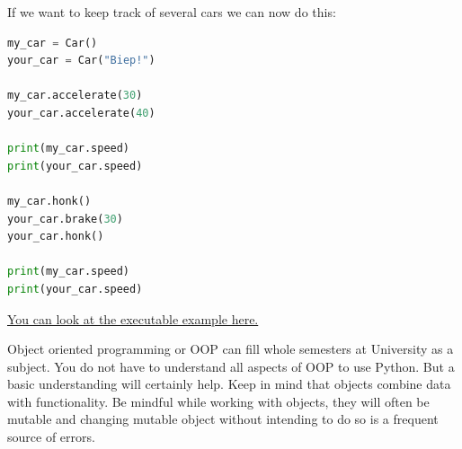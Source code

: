 \documentclass{article}
\begin{document}
If we want to keep track of several cars we can now do this:

\begin{lstlisting}[language=python]
my_car = Car()
your_car = Car("Biep!")

my_car.accelerate(30)
your_car.accelerate(40)

print(my_car.speed)
print(your_car.speed)

my_car.honk()
your_car.brake(30)
your_car.honk()

print(my_car.speed)
print(your_car.speed)
\end{lstlisting}

\href{http://pythontutor.com/visualize.html#code=class%20Car%28%29%3A%0A%0A%20%20%20%20horn_sound%3A%20str%20%3D%20%22Honk!%22%0A%20%20%20%20_speed%3A%20float%20%3D%200.0%0A%0A%20%20%20%20def%20__init__%28self,%20horn_sound%3A%20str%20%3D%20None%29%3A%0A%20%20%20%20%20%20%20%20if%20horn_sound%3A%0A%20%20%20%20%20%20%20%20%20%20%20%20self.horn_sound%20%3D%20horn_sound%0A%0A%20%20%20%20def%20accelerate%28self,%20kmh%3A%20float%20%3D%200.0%29%3A%0A%20%20%20%20%20%20%20%20self._speed%20%3D%20self._speed%20%2B%20kmh%0A%0A%20%20%20%20def%20brake%28self,%20target_kmh%3A%20float%20%3D%200.0%29%3A%0A%20%20%20%20%20%20%20%20if%20target_kmh%20%3C%20self._speed%3A%0A%20%20%20%20%20%20%20%20%20%20%20%20self._speed%20%3D%20float%28target_kmh%29%0A%0A%20%20%20%20def%20honk%28self%29%3A%0A%20%20%20%20%20%20%20%20print%28self.horn_sound%29%0A%0A%20%20%20%20%40property%0A%20%20%20%20def%20speed%28self%29%3A%0A%20%20%20%20%20%20%20%20return%20f%22%7Bself._speed%7D%20km/h%22%0A%20%20%20%20%20%20%20%20%0Amy_car%20%3D%20Car%28%29%0Ayour_car%20%3D%20Car%28%22Biep!%22%29%0A%0Amy_car.accelerate%2830%29%0Ayour_car.accelerate%2840%29%0A%0Aprint%28my_car.speed%29%0Aprint%28your_car.speed%29%0A%0Amy_car.honk%28%29%0Ayour_car.brake%2830%29%0Ayour_car.honk%28%29%0A%0Aprint%28my_car.speed%29%0Aprint%28your_car.speed%29%0A&cumulative=false&curInstr=47&heapPrimitives=nevernest&mode=display&origin=opt-frontend.js&py=3&rawInputLstJSON=%5B%5D&textReferences=false}{You can look at the executable example here.}

Object oriented programming or OOP can fill whole semesters at University as a subject.
You do not have to understand all aspects of OOP to use Python.
But a basic understanding will certainly help.
Keep in mind that objects combine data with functionality.
Be mindful while working with objects, they will often be mutable and
changing mutable object without intending to do so is a frequent source of errors.
\end{document}
